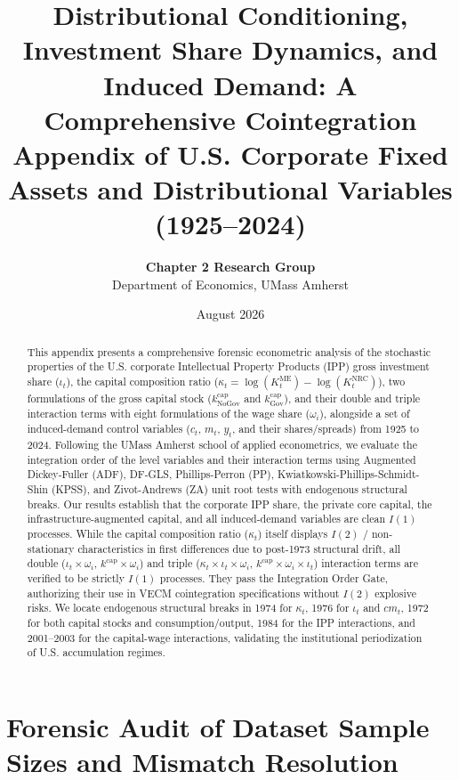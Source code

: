 \documentclass[11pt,a4paper]{article}
\title{\textbf{Distributional Conditioning, Investment Share Dynamics, and Induced Demand: A Comprehensive Cointegration Appendix of U.S. Corporate Fixed Assets and Distributional Variables (1925--2024)}}
\author{\textbf{Chapter 2 Research Group} \\ Department of Economics, UMass Amherst}
\date{August 2026}
\begin{document}
\maketitle

\begin{abstract}
This appendix presents a comprehensive forensic econometric analysis of the stochastic properties of the U.S. corporate Intellectual Property Products (IPP) gross investment share ($\iota_t$), the capital composition ratio ($\kappa_t = \log(K^{\text{ME}}_t) - \log(K^{\text{NRC}}_t)$), two formulations of the gross capital stock ($k^{\text{cap}}_{\text{NoGov}}$ and $k^{\text{cap}}_{\text{Gov}}$), and their double and triple interaction terms with eight formulations of the wage share ($\omega_i$), alongside a set of induced-demand control variables ($c_t$, $m_t$, $y_t$, and their shares/spreads) from 1925 to 2024. Following the UMass Amherst school of applied econometrics, we evaluate the integration order of the level variables and their interaction terms using Augmented Dickey-Fuller (ADF), DF-GLS, Phillips-Perron (PP), Kwiatkowski-Phillips-Schmidt-Shin (KPSS), and Zivot-Andrews (ZA) unit root tests with endogenous structural breaks. Our results establish that the corporate IPP share, the private core capital, the infrastructure-augmented capital, and all induced-demand variables are clean $I(1)$ processes. While the capital composition ratio ($\kappa_t$) itself displays $I(2)$ / non-stationary characteristics in first differences due to post-1973 structural drift, all double ($\iota_t \times \omega_i$, $k^{\text{cap}} \times \omega_i$) and triple ($\kappa_t \times \iota_t \times \omega_i$, $k^{\text{cap}} \times \omega_i \times \iota_t$) interaction terms are verified to be strictly $I(1)$ processes. They pass the Integration Order Gate, authorizing their use in VECM cointegration specifications without $I(2)$ explosive risks. We locate endogenous structural breaks in 1974 for $\kappa_t$, 1976 for $\iota_t$ and $cm_t$, 1972 for both capital stocks and consumption/output, 1984 for the IPP interactions, and 2001--2003 for the capital-wage interactions, validating the institutional periodization of U.S. accumulation regimes.
\end{abstract}

\FloatBarrier
\section{Forensic Audit of Dataset Sample Sizes and Mismatch Resolution}
\end{document}
